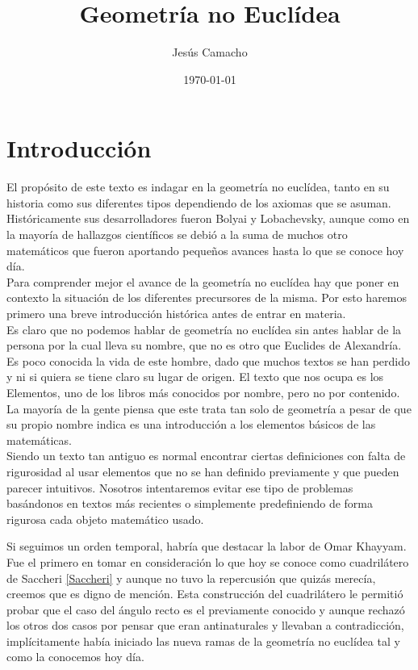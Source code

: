 \documentclass[a4paper]{amsart}
\title{Geometría no Euclídea}
\author{Jesús Camacho}
\date{\today}
\theoremstyle{plain}
\begin{document}
\maketitle


\section{Introducción}
El propósito de este texto es indagar en la geometría no euclídea, tanto en su historia como sus diferentes tipos dependiendo de los axiomas que se asuman. Históricamente sus desarrolladores fueron Bolyai y Lobachevsky, aunque como en la mayoría de hallazgos científicos se debió a la suma de muchos otro matemáticos que fueron aportando pequeños avances hasta lo que se conoce hoy día.\\

Para comprender mejor el avance de la geometría no euclídea hay que poner en contexto la situación de los diferentes precursores de la misma. Por esto haremos primero una breve introducción histórica antes de entrar en materia.\\

Es claro que no podemos hablar de geometría no euclídea sin antes hablar de la persona por la cual lleva su nombre, que no es otro que Euclides de Alexandría. Es poco conocida la vida de este hombre, dado que muchos textos se han perdido y ni si quiera se tiene claro su lugar de origen. El texto que nos ocupa es los Elementos, uno de los libros más conocidos por nombre, pero no por contenido. La mayoría de la gente piensa que este trata tan solo de geometría a pesar de que su propio nombre indica es una introducción a los elementos básicos de las matemáticas.\\
Siendo un texto tan antiguo es normal encontrar ciertas definiciones con falta de rigurosidad al usar elementos que no se han definido previamente y que pueden parecer intuitivos. Nosotros intentaremos evitar ese tipo de problemas basándonos en textos más recientes o simplemente predefiniendo de forma rigurosa cada objeto matemático usado.

Si seguimos un orden temporal, habría que destacar la labor de Omar Khayyam. Fue el primero en tomar en consideración lo que hoy se conoce como cuadrilátero de Saccheri \ref{Saccheri} y aunque no tuvo la repercusión que quizás merecía, creemos que es digno de mención. Esta construcción del cuadrilátero le permitió probar que el caso del ángulo recto es el previamente conocido y aunque rechazó los otros dos casos por pensar que eran antinaturales y llevaban a contradicción, implícitamente había iniciado las nueva ramas de la geometría no euclídea tal y como la conocemos hoy día.\\
\end{document}
